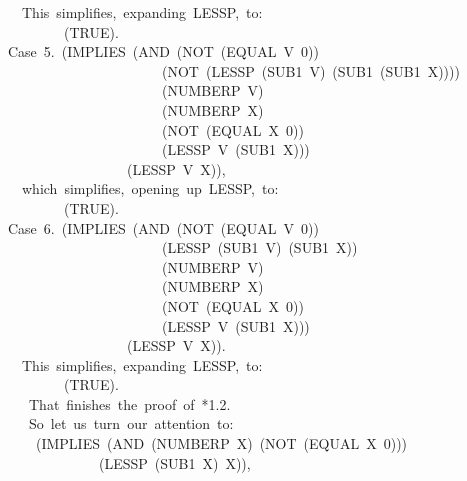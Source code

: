 \documentclass[11pt]{book}
\newenvironment{pubasis}{\begin{flushleft}\ttfamily\small}{\normalsize\rmfamily\end{flushleft}}
\begin{document}
\begin{pubasis}
~~~~This~simplifies,~expanding~LESSP,~to:\\

~~~~~~~~~~(TRUE).\\

~~Case~5.~(IMPLIES~(AND~(NOT~(EQUAL~V~0))\\
~~~~~~~~~~~~~~~~~~~~~~~~(NOT~(LESSP~(SUB1~V)~(SUB1~(SUB1~X))))\\
~~~~~~~~~~~~~~~~~~~~~~~~(NUMBERP~V)\\
~~~~~~~~~~~~~~~~~~~~~~~~(NUMBERP~X)\\
~~~~~~~~~~~~~~~~~~~~~~~~(NOT~(EQUAL~X~0))\\
~~~~~~~~~~~~~~~~~~~~~~~~(LESSP~V~(SUB1~X)))\\
~~~~~~~~~~~~~~~~~~~(LESSP~V~X)),\\

~~~~which~simplifies,~opening~up~LESSP,~to:\\

~~~~~~~~~~(TRUE).\\

~~Case~6.~(IMPLIES~(AND~(NOT~(EQUAL~V~0))\\
~~~~~~~~~~~~~~~~~~~~~~~~(LESSP~(SUB1~V)~(SUB1~X))\\
~~~~~~~~~~~~~~~~~~~~~~~~(NUMBERP~V)\\
~~~~~~~~~~~~~~~~~~~~~~~~(NUMBERP~X)\\
~~~~~~~~~~~~~~~~~~~~~~~~(NOT~(EQUAL~X~0))\\
~~~~~~~~~~~~~~~~~~~~~~~~(LESSP~V~(SUB1~X)))\\
~~~~~~~~~~~~~~~~~~~(LESSP~V~X)).\\

~~~~This~simplifies,~expanding~LESSP,~to:\\

~~~~~~~~~~(TRUE).\\

~~~~~That~finishes~the~proof~of~*1.2.\\

~~~~~So~let~us~turn~our~attention~to:\\

~~~~~~(IMPLIES~(AND~(NUMBERP~X)~(NOT~(EQUAL~X~0)))\\
~~~~~~~~~~~~~~~(LESSP~(SUB1~X)~X)),\\


\end{pubasis}
\end{document}
